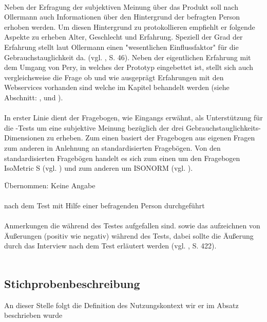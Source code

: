 \documentclass[Bachelorarbeit.tex]{subfiles}
\begin{document}
\\

Neben der Erfragung der subjektiven Meinung über das Produkt soll nach Ollermann auch Informationen über den Hintergrund der befragten Person erhoben werden.
Um diesen Hintergrund zu protokollieren empfiehlt er folgende Aspekte zu erheben Alter, Geschlecht und Erfahrung.
Speziell der Grad der Erfahrung stellt laut Ollermann einen "wesentlichen Einflussfaktor" für die Gebrauchstauglichkeit da. (vgl. \cite{Ollermann2007}, S. 46). 
Neben der eigentlichen Erfahrung mit dem Umgang von Pery, in welches der Prototyp eingebettet ist, stellt sich auch vergleichsweise die Frage ob und wie ausgeprägt Erfahrungen mit den Webservices vorhanden sind welche im Kapitel  behandelt werden (siehe Abschnitt: ,  und ).
\\
\\
In erster Linie dient der Fragebogen, wie Eingangs erwähnt, als Unterstützung für die -Tests um eine subjektive Meinung bezüglich der drei Gebrauchstauglichkeits-Dimensionen zu erheben. 
Zum einen basiert der Fragebogen aus eigenen Fragen zum anderen in Anlehnung an standardisierten Fragebögen.
Von den standardisierten Fragebögen handelt es sich zum einen um den Fragebogen IsoMetric S (vgl. \cite{Willumeit1993}) und zum anderen um ISONORM (vgl. \cite{Prumper1997}).

Übernommen: Keine Angabe 
\\
\\
nach dem Test mit Hilfe einer befragenden Person durchgeführt\\
\\
Anmerkungen die während des Testes aufgefallen sind. sowie das aufzeichnen von Äußerungen (positiv wie negativ) während des Tests, dabei sollte die Äußerung durch das Interview nach dem Test erläutert werden (vgl. \cite{Niegemann2008}, S. 422).\\
\\



\subsection{Stichprobenbeschreibung}
\label{Stichproben}
An dieser Stelle folgt die Definition des Nutzungskontext wir er im Absatz  beschrieben wurde
\end{document}
